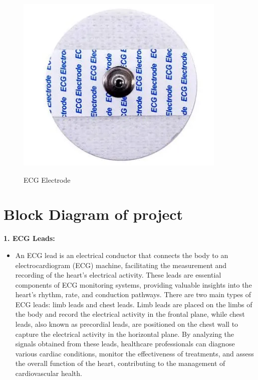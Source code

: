  \begin{figure}[htbp]
    \centering
     \includegraphics[width=0.7\linewidth]{C_chap/fig5.png}
\\\caption{ ECG Electrode}
 \end{figure}

\section{Block Diagram of project}

\textbf{1. ECG Leads:}
\begin{itemize}
    \item An ECG lead is an electrical conductor that connects the body to an electrocardiogram (ECG) machine, facilitating the measurement and recording of the heart's electrical activity. These leads are essential components of ECG monitoring systems, providing valuable insights into the heart's rhythm, rate, and conduction pathways. There are two main types of ECG leads: limb leads and chest leads. Limb leads are placed on the limbs of the body and record the electrical activity in the frontal plane, while chest leads, also known as precordial leads, are positioned on the chest wall to capture the electrical activity in the horizontal plane. By analyzing the signals obtained from these leads, healthcare professionals can diagnose various cardiac conditions, monitor the effectiveness of treatments, and assess the overall function of the heart, contributing to the management of cardiovascular health.
\end{itemize}

